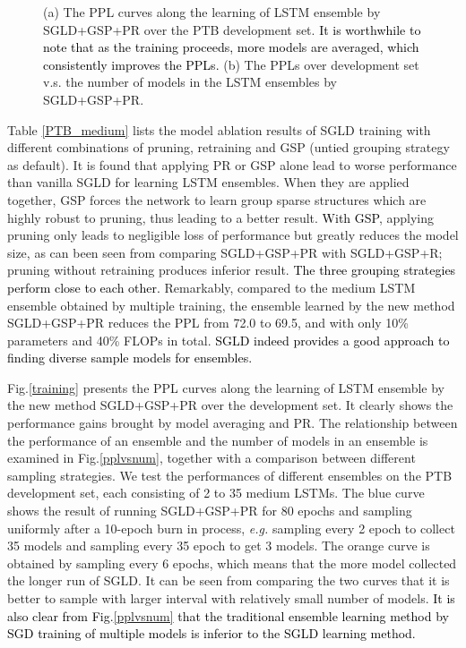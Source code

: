 \documentclass{article} %
\newcommand{\ozj}{\textcolor{black}}
\newcommand{\zyc}{\textcolor{black}}
\begin{document}
\begin{figure}[t]
	\begin{center}
	\end{center}
	\caption{(a) The PPL curves along the learning of LSTM ensemble by SGLD+GSP+PR over the PTB development set. 
		\ozj{It is worthwhile to note that as the training proceeds, more models are averaged, which consistently improves the PPLs.}  (b) 
		The PPLs over development set v.s. the number of models in the LSTM ensembles by SGLD+GSP+PR.}
	\label{curves}
\end{figure}

Table \ref{PTB_medium} lists the model ablation results of SGLD training with different combinations of pruning, retraining and GSP (untied grouping strategy as default).
It is found that applying PR or GSP alone lead to worse performance than vanilla SGLD for learning LSTM ensembles.
When they are applied together, GSP forces the network to learn group sparse structures which are highly robust to pruning, thus leading to a better result. 
\ozj{With GSP}, applying pruning only leads to negligible loss of performance but greatly reduces the model size, as can been seen from comparing SGLD+GSP+PR with SGLD+GSP+R;
pruning without retraining produces inferior result.
\zyc{The three grouping strategies perform close to each other.}
Remarkably, compared to the medium LSTM ensemble obtained by multiple training, the ensemble learned by the new method SGLD+GSP+PR reduces the PPL from 72.0 to 69.5, and with only 10\% parameters and 40\% FLOPs in total.
\ozj{SGLD indeed provides a good approach to finding diverse sample models for ensembles.}

Fig.\ref{training} presents the PPL curves along the learning of LSTM ensemble by the new method SGLD+GSP+PR over the development set. It clearly shows the performance gains brought by model averaging and PR.
The relationship between the performance of an ensemble and the number of models in an ensemble is examined in Fig.\ref{pplvsnum}, together with a comparison between different sampling strategies. 
We test the performances of different ensembles on the PTB development set, each consisting of 2 to 35 medium LSTMs.
The blue curve shows the result of running SGLD+GSP+PR for 80 epochs and sampling uniformly after a 10-epoch burn in process, \textit{e.g.} sampling every 2 epoch to collect 35 models and sampling every 35 epoch to get 3 models.  
The orange curve is obtained by sampling every 6 epochs, which means that the more model collected the longer run of SGLD. 
It can be seen from comparing the two curves that it is better to sample with larger interval with relatively small number of models.
\ozj{It is also clear from Fig.\ref{pplvsnum} that the traditional ensemble learning method by SGD training of multiple models is inferior to the SGLD learning method.}
\end{document}
